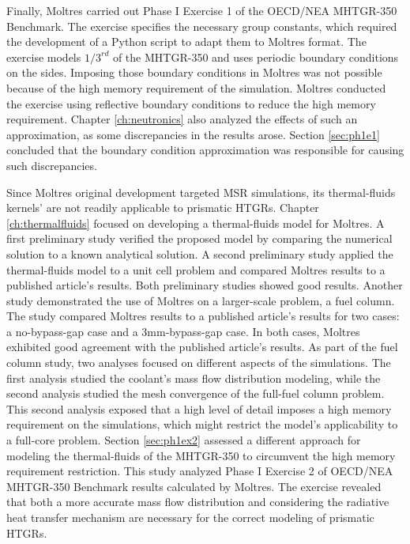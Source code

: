 Finally, Moltres carried out Phase I Exercise 1 of the OECD/NEA MHTGR-350 Benchmark.
The exercise specifies the necessary group constants, which required the development of a Python script to adapt them to Moltres format.
The exercise models $1/3^{rd}$ of the MHTGR-350 and uses periodic boundary conditions on the sides.
Imposing those boundary conditions in Moltres was not possible because of the high memory requirement of the simulation.
Moltres conducted the exercise using reflective boundary conditions to reduce the high memory requirement.
Chapter \ref{ch:neutronics} also analyzed the effects of such an approximation, as some discrepancies in the results arose.
Section \ref{sec:ph1e1} concluded that the boundary condition approximation was responsible for causing such discrepancies.

Since Moltres original development targeted MSR simulations, its thermal-fluids kernels' are not readily applicable to prismatic HTGRs.
Chapter \ref{ch:thermalfluids} focused on developing a thermal-fluids model for Moltres.
A first preliminary study verified the proposed model by comparing the numerical solution to a known analytical solution.
A second preliminary study applied the thermal-fluids model to a unit cell problem and compared Moltres results to a published article's results.
Both preliminary studies showed good results.
Another study demonstrated the use of Moltres on a larger-scale problem, a fuel column.
The study compared Moltres results to a published article's results for two cases: a no-bypass-gap case and a 3mm-bypass-gap case.
In both cases, Moltres exhibited good agreement with the published article's results.
As part of the fuel column study, two analyses focused on different aspects of the simulations.
The first analysis studied the coolant's mass flow distribution modeling, while the second analysis studied the mesh convergence of the full-fuel column problem.
This second analysis exposed that a high level of detail imposes a high memory requirement on the simulations, which might restrict the model's applicability to a full-core problem.
Section \ref{sec:ph1ex2} assessed a different approach for modeling the thermal-fluids of the MHTGR-350 to circumvent the high memory requirement restriction.
This study analyzed Phase I Exercise 2 of OECD/NEA MHTGR-350 Benchmark results calculated by Moltres.
The exercise revealed that both a more accurate mass flow distribution and considering the radiative heat transfer mechanism are necessary for the correct modeling of prismatic HTGRs.

